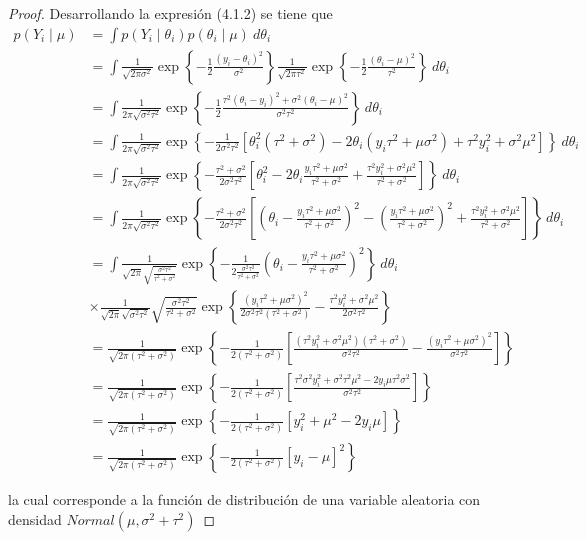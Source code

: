 \documentclass[10pt,openright]{book}\usepackage[]{graphicx}\usepackage[]{color}
\begin{document}
\begin{proof}
Desarrollando la expresi\'on (4.1.2) se tiene que
\begin{align*}
p(Y_i \mid \mu)&=\int p(Y_i \mid \theta_i)p(\theta_i \mid \mu) \ d\theta_i\\
&=\int \frac{1}{\sqrt{2\pi\sigma^2}}\exp\left\{-\frac{1}{2}\frac{(y_i-\theta_i)^2}{\sigma^2}\right\} \frac{1}{\sqrt{2\pi\tau^2}}\exp\left\{-\frac{1}{2}\frac{(\theta_i-\mu)^2}{\tau^2}\right\}\ d\theta_i\\
&=\int \frac{1}{2\pi\sqrt{\sigma^2\tau^2}}
\exp\left\{-\frac{1}{2}\frac{\tau^2(\theta_i-y_i)^2+\sigma^2(\theta_i-\mu)^2}{\sigma^2\tau^2}\right\}\ d\theta_i\\
&=\int \frac{1}{2\pi\sqrt{\sigma^2\tau^2}}
\exp\left\{-\frac{1}{2\sigma^2\tau^2}\left[\theta_i^2(\tau^2+\sigma^2)
-2\theta_i(y_i\tau^2+\mu\sigma^2)+\tau^2y_i^2+\sigma^2\mu^2\right]\right\}\ d\theta_i\\
&=\int \frac{1}{2\pi\sqrt{\sigma^2\tau^2}}
\exp\left\{-\frac{\tau^2+\sigma^2}{2\sigma^2\tau^2}
\left[\theta_i^2-2\theta_i\frac{y_i\tau^2+\mu\sigma^2}{\tau^2+\sigma^2}
+\frac{\tau^2y_i^2+\sigma^2\mu^2}{\tau^2+\sigma^2}\right]\right\}\ d\theta_i\\
&=\int \frac{1}{2\pi\sqrt{\sigma^2\tau^2}}
\exp\left\{-\frac{\tau^2+\sigma^2}{2\sigma^2\tau^2}
\left[(\theta_i-\frac{y_i\tau^2+\mu\sigma^2}{\tau^2+\sigma^2})^2
-\left(\frac{y_i\tau^2+\mu\sigma^2}{\tau^2+\sigma^2}\right)^2
+\frac{\tau^2y_i^2+\sigma^2\mu^2}{\tau^2+\sigma^2}\right]\right\}\ d\theta_i\\
&=\int \frac{1}{\sqrt{2\pi}\sqrt{\frac{\sigma^2\tau^2}{\tau^2+\sigma^2}}}
\exp\left\{-\frac{1}{2\frac{\sigma^2\tau^2}{\tau^2+\sigma^2}}
\left(\theta_i-\frac{y_i\tau^2+\mu\sigma^2}{\tau^2+\sigma^2}\right)^2\right\}\ d\theta_i \\
& \times \frac{1}{\sqrt{2\pi}\sqrt{\sigma^2\tau^2}}\sqrt{\frac{\sigma^2\tau^2}{\tau^2+\sigma^2}}
\exp\left\{\frac{(y_i\tau^2+\mu\sigma^2)^2}{2\sigma^2\tau^2(\tau^2+\sigma^2)}
-\frac{\tau^2y_i^2+\sigma^2\mu^2}{2\sigma^2\tau^2}\right\}\\
&=\frac{1}{\sqrt{2\pi(\tau^2+\sigma^2)}}
\exp\left\{-\frac{1}{2(\tau^2+\sigma^2)}
\left[\frac{(\tau^2y_i^2+\sigma^2\mu^2)(\tau^2+\sigma^2)}{\sigma^2\tau^2}
-\frac{(y_i\tau^2+\mu\sigma^2)^2}{\sigma^2\tau^2}\right]\right\}\\
&=\frac{1}{\sqrt{2\pi(\tau^2+\sigma^2)}}
\exp\left\{-\frac{1}{2(\tau^2+\sigma^2)}
\left[\frac{\tau^2\sigma^2y_i^2+\sigma^2\tau^2\mu^2
-2y_i\mu\tau^2\sigma^2}{\sigma^2\tau^2}\right]\right\}\\
&=\frac{1}{\sqrt{2\pi(\tau^2+\sigma^2)}}
\exp\left\{-\frac{1}{2(\tau^2+\sigma^2)}\left[y_i^2+\mu^2-2y_i\mu\right]\right\}\\
&=\frac{1}{\sqrt{2\pi(\tau^2+\sigma^2)}}
\exp\left\{-\frac{1}{2(\tau^2+\sigma^2)}\left[y_i-\mu\right]^2\right\}
\end{align*}

la cual corresponde a la funci\'on de distribuci\'on de una variable aleatoria con densidad $Normal(\mu,\sigma^2+ \tau^2)$
\end{proof}
\end{document}
